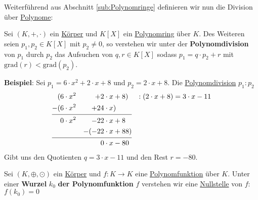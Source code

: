 \documentclass[../../main.tex]{subfiles}
\begin{document}
		Weiterführend aus Abschnitt \ref{sub:Polynomringe} definieren wir nun die Division über \hyperref[def:Polynom]{Polynome}:
		
		\begin{definition}[Polynomdivision]
			\label{def:Polynomdivision}
			Sei $(K,+,\cdot)$ ein \hyperref[def:Körper]{Körper} und $K[X]$ ein \hyperref[def:Polynomring]{Polynomring} über $K$. Des Weiteren seien $p_1,p_2 \in K[X]$ mit $p_2 \not = 0$, so verstehen wir unter der \textbf{Polynomdivision} von $p_1$ durch $p_2$ das Aufsuchen von $q,r \in K[X]$ sodass $p_1 = q \cdot p_2 + r$ mit $\textrm{grad}(r) < \textrm{grad}(p_2)$.
		\end{definition}
	
		\textbf{Beispiel}: Sei $p_1 = 6 \cdot x^2 + 2 \cdot x + 8$ und $p_2 = 2 \cdot x + 8$. Die \hyperref[def:Polynomdivision]{Polynomdivision} $p_1:p_2$
		\begin{alignat*}{5}
			( &6 \cdot x^2  &+  2 \cdot x &+ 8)              & :(2\cdot x + 8) = 3 \cdot x - 11 \\
			-(&6\cdot x^2   &+  24\cdot x &)  \\[-2ex]
			\cline{1-4} \\[-4.5ex]
			  &0\cdot x^2   &-  22 \cdot x &+ 8 \\	
			  &             &-(-22 \cdot x &+ 88) \\[-2ex]
			\cline{1-4} \\[-4.5ex]
			  &             &    0 \cdot x &- 80 
		\end{alignat*}
		Gibt uns den Quotienten $q = 3 \cdot x - 11$ und den Rest $r=-80$.
		
		\begin{definition}
			\label{def:Wurzel}
			Sei $(K,\oplus, \odot)$ ein \hyperref[def:Körper]{Körper} und $f:K\rightarrow K$ eine \hyperref[def:Polynomfunktion]{Polynomfunktion} über $K$. Unter einer \textbf{Wurzel} $k_0$ \textbf{der Polynomfunktion} $f$ verstehen wir eine \hyperref[def:Nullstelle]{Nullstelle} von $f$: $f(k_0)=0$
		\end{definition}
		
\end{document}
